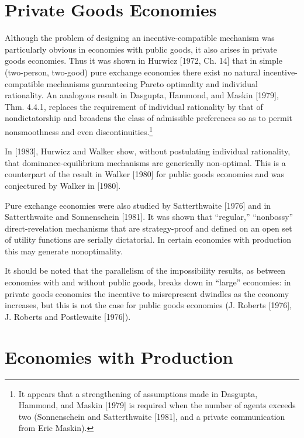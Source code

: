 \documentclass[12pt, letterpaper]{article}
\begin{document}
\section*{Private Goods Economies}

Although the problem of designing an incentive-compatible mechanism was particularly obvious in economies with public goods, it also arises in private goods economies. Thus it was shown in Hurwicz [1972, Ch. 14] that in simple (two-person, two-good) pure exchange economies there exist no natural incentive-compatible mechanisms guaranteeing Pareto optimality and individual rationality. An analogous result in Dasgupta, Hammond, and Maskin [1979], Thm. 4.4.1, replaces the requirement of individual rationality by that of nondictatorship and broadens the class of admissible preferences so as to permit nonsmoothness and even discontinuities.\footnote{It appears that a strengthening of assumptions made in Dasgupta, Hammond, and Maskin [1979] is required when the number of agents exceeds two (Sonnenschein and Satterthwaite [1981], and a private communication from Eric Maskin).}

In [1983], Hurwicz and Walker show, without postulating individual rationality, that dominance-equilibrium mechanisms are generically non-optimal. This is a counterpart of the result in Walker [1980] for public goods economies and was conjectured by Walker in [1980].

Pure exchange economies were also studied by Satterthwaite [1976] and in Satterthwaite and Sonnenschein [1981]. It was shown that ``regular,'' ``nonbossy'' direct-revelation mechanisms that are strategy-proof and defined on an open set of utility functions are serially dictatorial. In certain economies with production this may generate nonoptimality.

It should be noted that the parallelism of the impossibility results, as between economies with and without public goods, breaks down in ``large'' economies: in private goods economies the incentive to misrepresent dwindles as the economy increases, but this is not the case for public goods economies (J. Roberts [1976], J. Roberts and Postlewaite [1976]).

\section*{Economies with Production}
\end{document}
